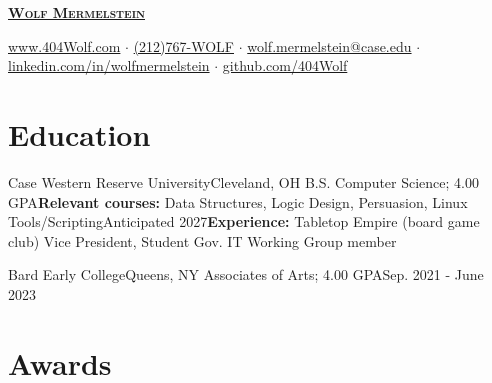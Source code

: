 \documentclass[letterpaper, 10pt]{article}
\begin{document}
	
	
	\begin{center}
		\textbf{\Huge \scshape \href{https://404wolf.com}{Wolf Mermelstein}} \\ \vspace{4pt}
		
		\href{https://404wolf.com}{www.404Wolf.com}
		$\cdot$
		\small \href{tel:(+12127679653)}{(212)767-WOLF}
		$\cdot$
		\href{mailto:wolf.mermelstein@case.edu}{wolf.mermelstein@case.edu}
		$\cdot$
		\href{https://linkedin.com/in/wolfmermelstein}{linkedin.com/in/wolfmermelstein}
		$\cdot$
		\href{https://github.com/404wolf}{github.com/404Wolf}
	\end{center}
	\vspace{-18px}
	
	\section{Education}
	\resumeSubHeadingListStart
	   \resumeSubheading
	   {Case Western Reserve University}{Cleveland, OH}
     {B.S. Computer Science; 4.00 GPA}{\textbf{Relevant courses:} Data Structures, Logic Design, Persuasion, Linux Tools/Scripting}{Anticipated 2027}{\textbf{Experience:} Tabletop Empire (board game club) Vice President, Student Gov. IT Working Group member}

	   \resumeSubheading
	   {Bard Early College}{Queens, NY}{}
	   {Associates of Arts;  4.00 GPA}{Sep. 2021 - June 2023}{}
	\resumeSubHeadingListEnd
	
	\section{Awards}
	\resumeSubHeadingListStart
	

	
	
		
	\resumeSubHeadingListEnd
	
\end{document}
